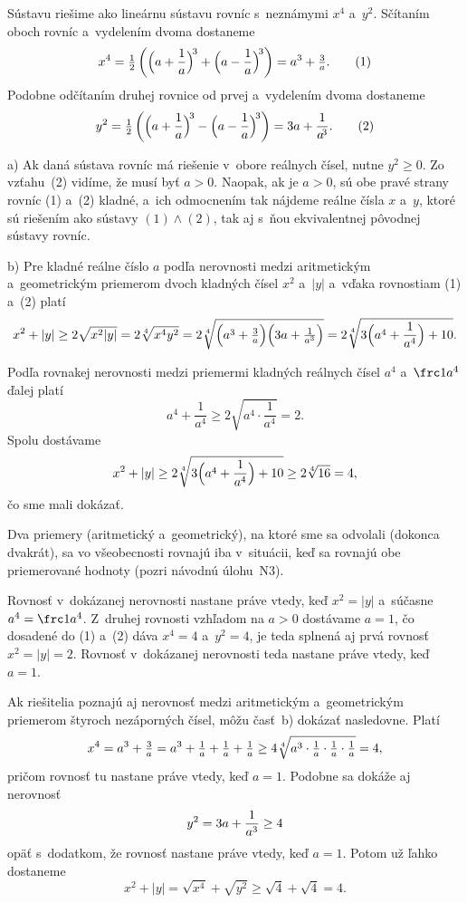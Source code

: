 {%
Sústavu riešime ako lineárnu sústavu rovníc s~neznámymi $x^4$ a~$y^2$.
Sčítaním oboch rovníc a~vydelením dvoma dostaneme
$$
x^4=\frac12\left(\Big(a+{1\over a}\Big)^{\!3}+\Big(a-{1\over a}\Big)^{\!3}\right)
=a^3+\frac3a.
\tag1
$$
Podobne odčítaním druhej rovnice od prvej a~vydelením dvoma dostaneme
$$
y^2=\frac12\left(\Big(a+{1\over a}\Big)^{\!3}-\Big(a-{1\over a}\Big)^{\!3}\right)
=3a+{1\over a^{\!3}}.
\tag2
$$

a)
Ak daná sústava rovníc má riešenie v~obore reálnych čísel, nutne $y^2\ge0$.
Zo vzťahu~(2) vidíme, že musí byť $a>0$. Naopak, ak je $a>0$,
sú obe pravé strany rovníc (1) a~(2) kladné, a~ich odmocnením
tak nájdeme reálne čísla $x$ a~$y$, ktoré sú riešením ako sústavy
$(1)\land(2)$, tak aj s~ňou ekvivalentnej pôvodnej sústavy rovníc.

b)
Pre kladné reálne číslo $a$ podľa nerovnosti medzi aritmetickým
a~geometrickým priemerom dvoch kladných čísel $x^2$ a~$|y|$ a~vďaka rovnostiam (1)
a~(2) platí
$$
x^2+|y|\ge2\sqrt{x^2|y|}=2\root4\of{x^4y^2}=2\root4\of{\Big(a^3+\frac3a\Big)
\Big(3a+\frac1{a^3}\Big)}=2\root4\of{3\Big(a^4+{1\over a^4}\Big)+10}.
$$

Podľa rovnakej nerovnosti medzi priemermi kladných reálnych čísel $a^4$ a~$\frc1{a^4}$
ďalej platí
$$
a^4+\frac1{a^4}\ge2\sqrt{a^4\cdot\frac1{a^4}}=2.
$$
Spolu dostávame
$$
\postdisplaypenalty 10000
x^2+|y|\ge2\root4\of{3\Big(a^4+{1\over a^4}\Big)+10}\ge2\root4\of{16}=4,
$$
čo sme mali dokázať.

Dva priemery (aritmetický a~geometrický), na ktoré sme sa odvolali
(dokonca dvakrát), sa vo všeobecnosti rovnajú iba v~situácii, keď sa rovnajú obe
priemerované hodnoty (pozri návodnú úlohu~N3).

Rovnosť v~dokázanej nerovnosti nastane práve vtedy, keď $x^2=|y|$ a~súčasne
$a^4=\frc1{a^4}$. Z~druhej rovnosti vzhľadom na $a>0$ dostávame $a=1$, čo dosadené
do (1) a~(2) dáva $x^4=4$ a~$y^2=4$, je teda splnená aj prvá rovnosť $x^2=|y|=2$.
Rovnosť v~dokázanej nerovnosti teda nastane práve vtedy, keď $a=1$.

\poznamka
Ak riešitelia poznajú aj nerovnosť medzi aritmetickým a~geometrickým priemerom
štyroch nezáporných čísel, môžu časť~b) dokázať nasledovne. Platí
$$
x^4=a^3+\frac3a=a^3+\frac1a+\frac1a+\frac1a
\ge4\root4\of{a^3\cdot\frac1a\cdot\frac1a\cdot\frac1a}=4,
$$
pričom rovnosť tu nastane práve vtedy, keď $a=1$. Podobne sa dokáže
aj nerovnosť
$$
y^2=3a+{1\over a^3}\ge4
$$
opäť s~dodatkom, že rovnosť nastane práve vtedy, keď $a=1$. Potom už ľahko
dostaneme
$$
x^2+|y|=\sqrt{x^4}+\sqrt{y^2}\ge\sqrt{4}+\sqrt{4}=4.
$$

}
